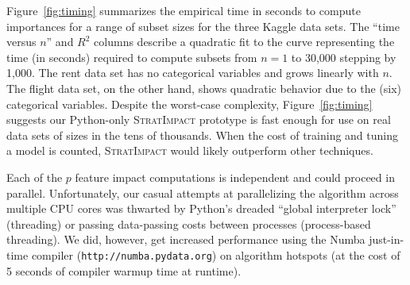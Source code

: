 \documentclass[11pt]{article}
\newcommand{\figref}[1]{Figure~\ref{#1}}
\newcommand{\simp}{\fontfamily{cmr}\textsc{\small StratImpact}}
\begin{document}
\figref{fig:timing} summarizes the empirical time in seconds to compute importances for a range of subset sizes for the three Kaggle data sets. The ``time versus $n$'' and $R^2$ columns describe a quadratic fit to the curve representing the time (in seconds) required to compute subsets from $n=1$ to 30,000 stepping by 1,000. The rent data set has no categorical variables and grows linearly with $n$. The flight data set, on the other hand, shows quadratic behavior due to the (six) categorical variables. Despite the worst-case complexity, \figref{fig:timing} suggests our Python-only \simp{} prototype is fast enough for use on real data sets of sizes in the tens of thousands. When the cost of training and tuning a model is counted, \simp{} would likely outperform other techniques.

Each of the $p$ feature impact computations is independent and could proceed in parallel. Unfortunately, our casual attempts at parallelizing the algorithm across multiple CPU cores was thwarted by Python's dreaded ``global interpreter lock'' (threading) or passing data-passing costs between processes (process-based threading).  We did, however, get increased performance using the Numba just-in-time compiler ({\tt\small http://numba.pydata.org}) on algorithm hotspots (at the cost of 5 seconds of compiler warmup time at runtime).
\end{document}
